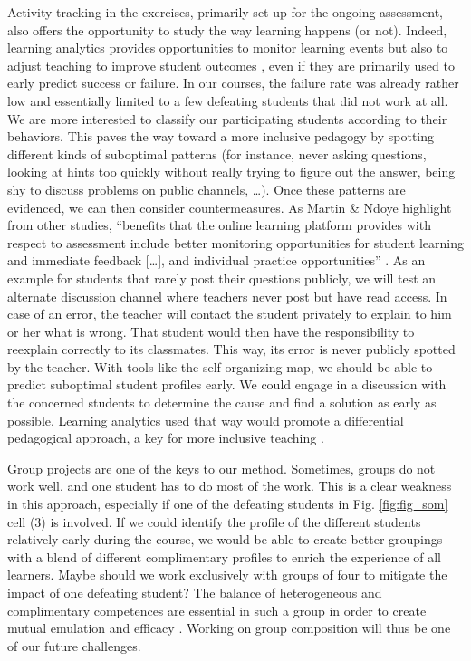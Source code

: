 \documentclass{aims}
\theoremstyle{definition}
\begin{document}
Activity tracking in the exercises, primarily set up for the ongoing
assessment, also offers the opportunity to study the way learning
happens (or not). Indeed, learning analytics provides opportunities to
monitor learning events but also to adjust teaching to improve student
outcomes \cite{Martin2016, Romero2020}, even if they are primarily used
to early predict success or failure. In our courses, the failure rate
was already rather low and essentially limited to a few defeating
students that did not work at all. We are more interested to classify
our participating students according to their behaviors. This paves the
way toward a more inclusive pedagogy by spotting different kinds of
suboptimal patterns (for instance, never asking questions, looking at
hints too quickly without really trying to figure out the answer, being
shy to discuss problems on public channels, \ldots). Once these patterns
are evidenced, we can then consider countermeasures. As Martin \& Ndoye
highlight from other studies, ``benefits that the online learning
platform provides with respect to assessment include better monitoring
opportunities for student learning and immediate feedback {[}\ldots{]},
and individual practice opportunities'' \cite{Martin2016}. As an example
for students that rarely post their questions publicly, we will test an
alternate discussion channel where teachers never post but have read
access. In case of an error, the teacher will contact the student
privately to explain to him or her what is wrong. That student would
then have the responsibility to reexplain correctly to its classmates.
This way, its error is never publicly spotted by the teacher. With tools
like the self-organizing map, we should be able to predict suboptimal
student profiles early. We could engage in a discussion with the
concerned students to determine the cause and find a solution as early
as possible. Learning analytics used that way would promote a
differential pedagogical approach, a key for more inclusive teaching
\cite{Siemens2013}.

Group projects are one of the keys to our method. Sometimes, groups do
not work well, and one student has to do most of the work. This is a
clear weakness in this approach, especially if one of the defeating
students in Fig. \ref {fig:fig_som} cell (3) is involved. If we could
identify the profile of the different students relatively early during
the course, we would be able to create better groupings with a blend of
different complimentary profiles to enrich the experience of all
learners. Maybe should we work exclusively with groups of four to
mitigate the impact of one defeating student? The balance of
heterogeneous and complimentary competences are essential in such a
group in order to create mutual emulation and efficacy
\cite{Mucchielli1996}. Working on group composition will thus be one of
our future challenges.
\end{document}
